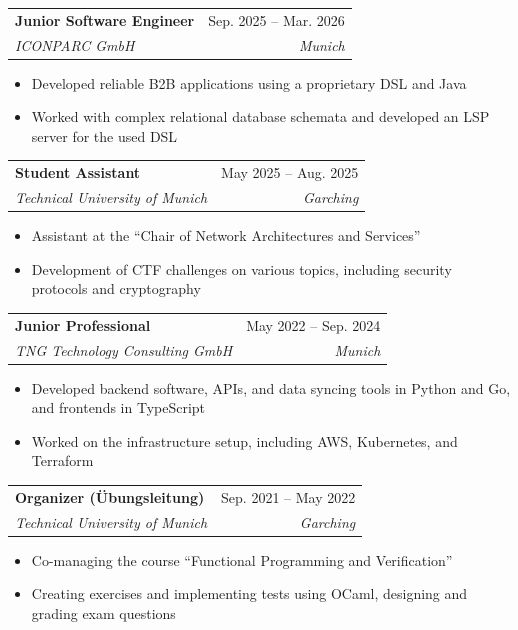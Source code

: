 \documentclass[letterpaper,11pt]{article}
\makeatletter
\newcommand{\resumeItem}[1]{
    \item\small{
            {#1 \vspace{-2pt}}
    }
}
\newcommand{\resumeSubheading}[4]{
    \vspace{-2pt}\item
    \begin{tabular*}{0.97\textwidth}[t]{l@{\extracolsep{\fill}}r}
    \textbf{#1} & #2 \\
    \textit{\small#3} & \textit{\small #4} \\
    \end{tabular*}\vspace{-7pt}
}
\newcommand{\resumeSubSubheading}[2]{
    \item
    \begin{tabular*}{0.97\textwidth}{l@{\extracolsep{\fill}}r}
    \textit{\small#1} & \textit{\small #2} \\
    \end{tabular*}\vspace{-7pt}
}
\newcommand{\resumeSubHeadingListEnd}{\end{itemize}}
\newcommand{\resumeItemListStart}{\begin{itemize}}
\newcommand{\resumeItemListEnd}{\end{itemize}\vspace{-5pt}}
\makeatother
\begin{document}
    \resumeSubheading
    {Junior Software Engineer}{Sep. 2025 -- Mar. 2026}
    {ICONPARC GmbH}{Munich}
    \resumeItemListStart
    \resumeItem{Developed reliable B2B applications using a proprietary DSL and Java}
    \resumeItem{Worked with complex relational database schemata and developed an LSP server for the used DSL}
    \resumeItemListEnd


    \resumeSubheading
    {Student Assistant}{May 2025 -- Aug. 2025}
    {Technical University of Munich}{Garching}
    \resumeItemListStart
    \resumeItem{Assistant at the \enquote{Chair of Network Architectures and Services}}
    \resumeItem{Development of CTF challenges on various topics, including security protocols and cryptography}
    \resumeItemListEnd

    \resumeSubheading
    {Junior Professional}{May 2022 -- Sep. 2024}
    {TNG Technology Consulting GmbH}{Munich}
    \resumeItemListStart
    \resumeItem{Developed backend software, APIs, and data syncing tools in Python and Go, and frontends in TypeScript}
    \resumeItem{Worked on the infrastructure setup, including AWS, Kubernetes, and Terraform}
    \resumeItemListEnd

    \resumeSubheading
    {Organizer (Übungsleitung)}{Sep. 2021 -- May 2022}
    {Technical University of Munich}{Garching}
    \resumeItemListStart
    \resumeItem{Co-managing the course \enquote{Functional Programming and Verification}}
    \resumeItem{Creating exercises and implementing tests using OCaml, designing and grading exam questions}
    \resumeItemListEnd


\end{document}
